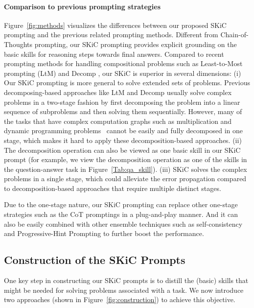 \paragraph{Comparison to previous prompting strategies}
Figure~\ref{fig:methods} visualizes the differences between our proposed SKiC prompting and the previous related prompting methods. Different from Chain-of-Thoughts prompting, our SKiC prompting provides explicit grounding on the basic skills for reasoning steps towards final answers. Compared to recent prompting methods for handling compositional problems such as Least-to-Most prompting (LtM) \citep{zhou2022least} and Decomp \citep{khot2022decomposed}, our SKiC is superior in several dimensions: (i) Our SKiC prompting is more general to solve extended sets of problems. Previous decomposing-based approaches like LtM and Decomp usually solve complex problems in a two-stage fashion by first decomposing the problem into a linear sequence of subproblems and then solving them sequentially. However, many of the tasks that have complex computation graphs such as multiplication and dynamic programming problems~\citep{dziri2023faith} cannot be easily and fully decomposed in one stage, which makes it hard to apply these decomposition-based approaches. (ii) The decomposition operation can also be viewed as one basic skill in our SKiC prompt (for example, we view the decomposition operation as one of the skills in the question-answer task in Figure~\ref{Tab:qa_skill}). (iii) SKiC solves the complex problems in a single stage, which could alleviate the error propagation compared to decomposition-based approaches that require multiple distinct stages.


Due to the one-stage nature, our SKiC prompting can replace other one-stage strategies such as the CoT promptings in a plug-and-play manner. And it can also be easily combined with other ensemble techniques such as self-consistency \citep{cot_wei_sc} and Progressive-Hint Prompting \citep{zheng2023progressive} to further boost the performance.




\subsection{Construction of the SKiC Prompts} \label{Sec:skic_construction}





One key step in constructing our SKiC prompts is to distill the (basic) skills that might be needed for solving problems associated with a task. We now introduce two approaches (shown in Figure~\ref{fig:construction}) to achieve this objective.







